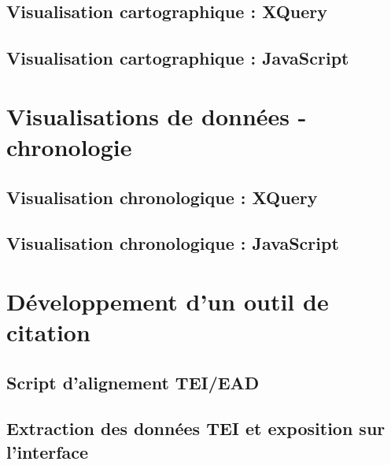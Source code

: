 \documentclass[a4paper,12pt,twoside]{book}
\begin{document}
        \section{Visualisation cartographique : XQuery}
        
        \clearpage
        \newline
        \section{Visualisation cartographique : JavaScript}
        

    \chapter[Visualisations de données - chronologie]{\label{label}Visualisations de données - chronologie}
        \newline
        \section{Visualisation chronologique : XQuery}
	    
	    \clearpage
        \newline
        \section{Visualisation chronologique : JavaScript}
        

    \chapter[Développement d'un outil de citation]{\label{label}Développement d'un outil de citation}
        \newline
        \section{Script d'alignement TEI/EAD}
	    
	    \clearpage
        \newline
        \section{Extraction des données TEI et exposition sur l'interface}
        
\end{document}

